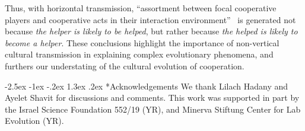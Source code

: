 \documentclass[12pt]{extarticle}
\makeatletter
\renewcommand\section{\@startsection {section}{1}{\z@}%
     {-2.5ex \@plus -1ex \@minus -.2ex}%
     {1.3ex \@plus.2ex}%
    {\Large\bfseries}}
\makeatother
\begin{document}
{Thus, with horizontal transmission, ``assortment between focal cooperative players and cooperative acts in their interaction
environment''~\citep{Fletcher2009assortment} is generated not because \emph{the helper is likely to be helped}, but rather because \emph{the helped is likely to become a helper}.
These conclusions highlight the importance of non-vertical cultural transmission in explaining complex evolutionary phenomena, and  furthers our understating of the cultural evolution of cooperation. 



{\small
\section*{Acknowledgements}
We thank Lilach Hadany and Ayelet Shavit for discussions and comments.
This work was supported in part by
the Israel Science Foundation 552/19 (YR),
and Minerva Stiftung Center for Lab Evolution (YR).
}



\begin{appendices}
\renewcommand{\theequation}{\thesection\arabic{equation}}


\end{appendices}}
\end{document}
